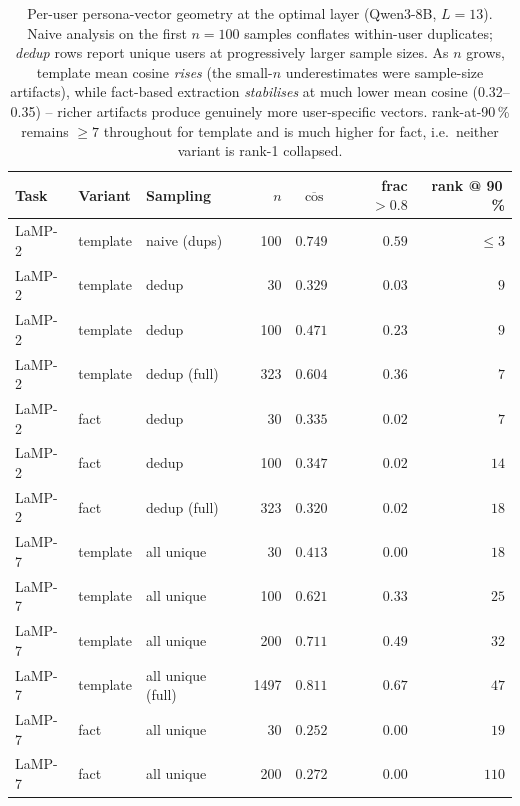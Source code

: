 \begin{table}[t]
\centering\small
\caption{Per-user persona-vector geometry at the optimal layer
(Qwen3-8B, $L{=}13$).  Naive analysis on the first $n{=}100$ samples
conflates within-user duplicates; \emph{dedup} rows report unique
users at progressively larger sample sizes.  As $n$ grows, template
mean cosine \emph{rises} (the small-$n$ underestimates were
sample-size artifacts), while fact-based extraction \emph{stabilises}
at much lower mean cosine (0.32--0.35) -- richer artifacts produce
genuinely more user-specific vectors.  rank-at-90\,\% remains
$\!\ge\!7$ throughout for template and is much higher for fact,
i.e.\ neither variant is rank-1 collapsed.}
\label{tab:geometry}
\begin{tabular}{lllrrrr}
\toprule
Task     & Variant   & Sampling     & $n$  & $\overline{\cos}$ & frac $>\!0.8$ & rank @ 90\,\% \\
\midrule
LaMP-2   & template & naive (dups) & 100 & $0.749$           & $0.59$ & $\le 3$ \\
LaMP-2   & template & dedup        & 30  & $0.329$           & $0.03$ & $9$ \\
LaMP-2   & template & dedup        & 100 & $0.471$           & $0.23$ & $9$ \\
LaMP-2   & template & dedup (full) & 323 & $\mathbf{0.604}$  & $0.36$ & $7$ \\
LaMP-2   & fact     & dedup        & 30  & $0.335$           & $0.02$ & $7$ \\
LaMP-2   & fact     & dedup        & 100 & $0.347$           & $0.02$ & $14$ \\
LaMP-2   & fact     & dedup (full) & 323 & $\mathbf{0.320}$  & $0.02$ & $18$ \\
\midrule
LaMP-7   & template & all unique   & 30  & $0.413$           & $0.00$ & $18$ \\
LaMP-7   & template & all unique   & 100 & $0.621$           & $0.33$ & $25$ \\
LaMP-7   & template & all unique   & 200 & $0.711$           & $0.49$ & $32$ \\
LaMP-7   & template & all unique (full) & 1497 & $\mathbf{0.811}$ & $0.67$ & $47$ \\
LaMP-7   & fact     & all unique   & 30  & $0.252$           & $0.00$ & $19$ \\
LaMP-7   & fact     & all unique   & 200 & $\mathbf{0.272}$  & $0.00$ & $110$ \\
\bottomrule
\end{tabular}
\end{table}
